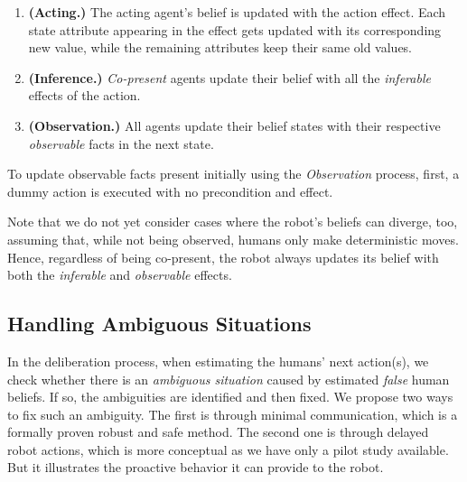 \documentclass[letterpaper]{article} %
\begin{document}
\begin{enumerate}
    \item \textbf{(Acting.)} The acting agent's belief is updated with the action effect. Each state attribute appearing in the effect gets updated with its corresponding new value, while the remaining attributes keep their same old values.
    \item \textbf{(Inference.)} \textit{Co-present} agents update their belief with all the \textit{inferable} effects of the action.
    \item \textbf{(Observation.)} All agents update their belief states with their respective \textit{observable} facts in the next state. 
\end{enumerate}

To update observable facts present initially using the \textit{Observation} process, first, a dummy action is executed with no precondition and effect.

Note that we do not yet consider cases where the robot's beliefs can diverge, too, assuming that, while not being observed, humans only make deterministic moves. Hence, regardless of being co-present, the robot always updates its belief with both the \textit{inferable} and \textit{observable} effects.

\subsection{Handling Ambiguous Situations}
In the deliberation process, when estimating the humans' next action(s), we check whether there is an \textit{ambiguous situation} caused by estimated \textit{false} human beliefs. 
If so, the ambiguities are identified and then fixed. 
We propose two ways to fix such an ambiguity. The first is through minimal communication, which is a formally proven robust and safe method. The second one is through delayed robot actions, which is more conceptual as we have only a pilot study available. But it illustrates the proactive behavior it can provide to the robot.
\end{document}
